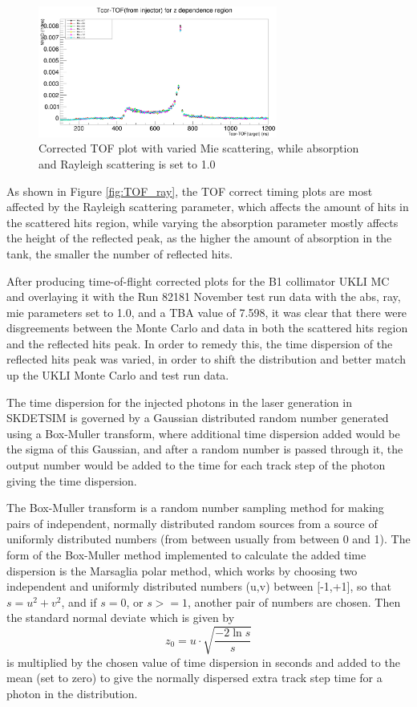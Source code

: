 \begin{figure}
    \centering
    \includegraphics[width=0.7\textwidth]{Figures/TOF_mie.PNG}
    \caption{Corrected TOF plot with varied Mie scattering, while absorption and Rayleigh scattering is set to 1.0}
    \label{fig:TOF_mie}
\end{figure}

As shown in Figure \ref{fig:TOF_ray}, the TOF correct timing plots are most affected by the Rayleigh scattering parameter, which affects the amount of hits in the scattered hits region, while varying the absorption parameter mostly affects the height of the reflected peak, as the higher the amount of absorption in the tank, the smaller the number of reflected hits. 

After producing time-of-flight corrected plots for the B1 collimator UKLI MC and overlaying it with the Run 82181 November test run data with the abs, ray, mie parameters set to 1.0, and a TBA value of 7.598, it was clear that there were disgreements between the Monte Carlo and data in both the scattered hits region and the reflected hits peak. In order to remedy this, the time dispersion of the reflected hits peak was varied, in order to shift the distribution and better match up the UKLI Monte Carlo and test run data. 

The time dispersion for the injected photons in the laser generation in SKDETSIM is governed by a Gaussian distributed random number generated using a Box-Muller transform, where additional time dispersion added would be the sigma of this Gaussian, and after a random number is passed through it, the output number would be added to the time for each track step of the photon giving the time dispersion.

The Box-Muller transform is a random number sampling method for making pairs of independent, normally distributed random sources from a source of uniformly distributed numbers (from between usually from between 0 and 1). The form of the Box-Muller method implemented to calculate the added time dispersion is the Marsaglia polar method, which works by choosing two independent and uniformly distributed numbers (u,v) between [-1,+1], so that $s = u^{2} + v^{2}$, and if $s=0$, or $s>=1$, another pair of numbers are chosen. Then the standard normal deviate which is given by $$z_{0}=u \cdot \sqrt{\frac{-2 \ln s}{s}}$$ is multiplied by the chosen value of time dispersion in seconds and added to the mean (set to zero) to give the normally dispersed extra track step time for a photon in the distribution. 

